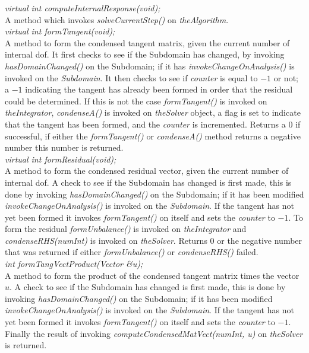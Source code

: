 {\em     virtual int  computeInternalResponse(void);}\\
A method which invokes {\em solveCurrentStep()} on {\em theAlgorithm}.  \\

{\em     virtual int  formTangent(void);}\\
A method to form the condensed tangent matrix, given the current
number of internal dof. It first checks to see if the Subdomain has
changed, by  invoking {\em hasDomainChanged()} on the Subdomain; if it
has {\em invokeChangeOnAnalysis()} is invoked on the {\em
Subdomain}. It then checks to see if {\em counter} is equal to $-1$ or
not; a $-1$ indicating the tangent has already been formed in order
that the residual could be determined. If this is not the case {\em
formTangent()} is invoked on {\em theIntegrator}, {\em condenseA()} is
invoked on {\em theSolver} object, a flag is set to indicate that the
tangent has been formed, and the {\em counter} is incremented. Returns
a $0$ if successful, if either the {\em formTangent()} or {\em
condenseA()} method returns a negative number this number is
returned. \\  

{\em     virtual int  formResidual(void);}\\
A method to form the condensed residual vector, given the current
number of internal dof. A check to see if the Subdomain has changed is first made, 
this is done by invoking {\em hasDomainChanged()} on the Subdomain; if it has 
been modified {\em invokeChangeOnAnalysis()} 
is invoked on the {\em Subdomain}. If the tangent has not yet been formed
it invokes {\em formTangent()} on itself and sets the {\em counter} to $-1$.
To form the residual {\em formUnbalance()} is invoked on {\em theIntegrator} and
{\em condenseRHS(numInt)} is invoked on {\em theSolver}. Returns $0$ or the negative
number that was returned if either {\em formUnbalance()} or {\em condenseRHS()} failed.\\

{\em int  formTangVectProduct(Vector \&u);}\\
A method to form the product of the condensed tangent matrix times the
vector $u$. A check to see if the Subdomain has changed is first made, 
this is done by invoking {\em hasDomainChanged()} on the Subdomain; if it has 
been modified {\em invokeChangeOnAnalysis()} 
is invoked on the {\em Subdomain}. If the tangent has not yet been formed
it invokes {\em formTangent()} on itself and sets the {\em counter} to $-1$.
Finally the result of invoking {\em computeCondensedMatVect(numInt, u)} on {\em
theSolver} is returned. \\


